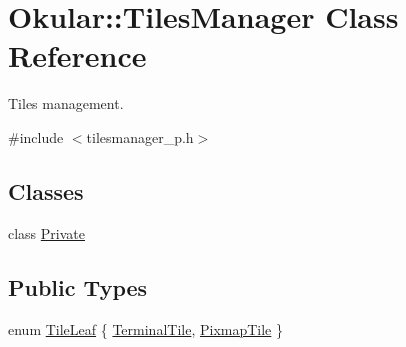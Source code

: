 \hypertarget{classOkular_1_1TilesManager}{\section{Okular\+:\+:Tiles\+Manager Class Reference}
\label{classOkular_1_1TilesManager}
}


Tiles management.  




{\ttfamily \#include $<$tilesmanager\+\_\+p.\+h$>$}

\subsection*{Classes}
\begin{DoxyCompactItemize}
\item 
class \hyperlink{classTilesManager_1_1Private}{Private}
\end{DoxyCompactItemize}
\subsection*{Public Types}
\begin{DoxyCompactItemize}
\item 
enum \hyperlink{classOkular_1_1TilesManager_a89f92ae8fdfb530b5625343876f63e29}{Tile\+Leaf} \{ \hyperlink{classOkular_1_1TilesManager_a89f92ae8fdfb530b5625343876f63e29a24b2eb2966bd8c2768047de2d1048d2d}{Terminal\+Tile}, 
\hyperlink{classOkular_1_1TilesManager_a89f92ae8fdfb530b5625343876f63e29acc56878534ab2362809b89ccbf69d031}{Pixmap\+Tile}
 \}
\end{DoxyCompactItemize}
